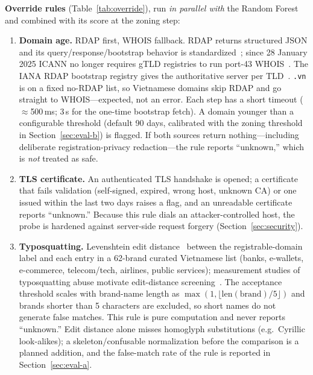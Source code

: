 \documentclass[conference]{IEEEtran}
\begin{document}
\textbf{Override rules} (Table~\ref{tab:override}), run \emph{in parallel with}
the Random Forest and combined with its score at the zoning step:
\begin{enumerate}
\item \textbf{Domain age.} RDAP first, WHOIS fallback. RDAP returns structured
JSON and its query/response/bootstrap behavior is
standardized~\cite{rfc9082,rfc9083,rfc9224}; since 28 January 2025 ICANN no longer
requires gTLD registries to run port-43 WHOIS~\cite{icann_rdap}. The IANA RDAP
bootstrap registry gives the authoritative server per TLD~\cite{rfc9224}.
\texttt{.vn} is on a fixed no-RDAP list, so Vietnamese domains skip RDAP and go
straight to WHOIS---expected, not an error. Each step has a short timeout
($\approx$500\,ms; 3\,s for the one-time bootstrap fetch). A domain younger than a
configurable threshold (default 90 days, calibrated with the zoning threshold in
Section~\ref{sec:eval-b}) is flagged. If both sources return nothing---including
deliberate registration-privacy redaction---the rule reports ``unknown,'' which
is \emph{not} treated as safe.
\item \textbf{TLS certificate.} An authenticated TLS handshake is opened; a
certificate that fails validation (self-signed, expired, wrong host, unknown CA)
or one issued within the last two days raises a flag, and an unreadable
certificate reports ``unknown.'' Because this rule dials an attacker-controlled
host, the probe is hardened against server-side request forgery
(Section~\ref{sec:security}).
\item \textbf{Typosquatting.} Levenshtein edit distance~\cite{levenshtein1966}
between the registrable-domain label and each entry in a 62-brand curated
Vietnamese list (banks, e-wallets, e-commerce, telecom/tech, airlines, public
services); measurement studies of typosquatting abuse motivate edit-distance
screening~\cite{szurdi2014typo,agten2015typo}. The acceptance threshold scales
with brand-name length as $\max(1,\lfloor \mathrm{len(brand)}/5 \rfloor)$ and
brands shorter than 5 characters are excluded, so short names do not generate
false matches. This rule is pure computation and never reports ``unknown.'' Edit distance alone misses homoglyph substitutions (e.g.\ Cyrillic
look-alikes); a skeleton/confusable normalization before the comparison is a
planned addition, and the false-match rate of the rule is reported in
Section~\ref{sec:eval-a}.
\end{enumerate}
\end{document}
